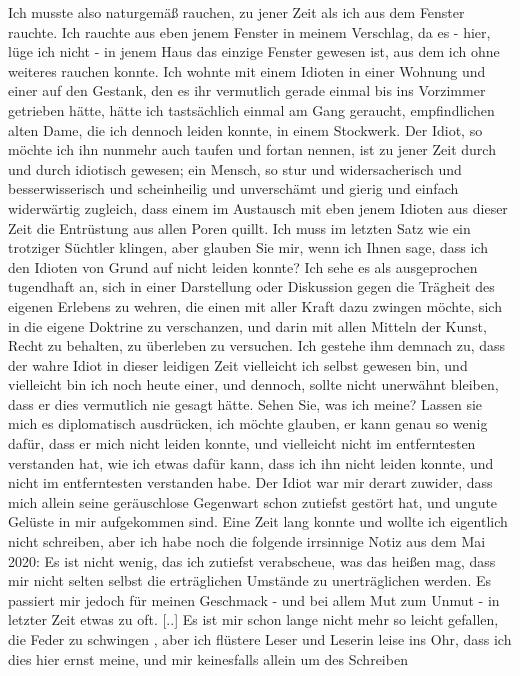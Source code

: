 \documentclass{scrbook}
\begin{document}
Ich musste also naturgemäß rauchen, zu jener Zeit als ich aus dem Fenster
rauchte. Ich rauchte aus eben jenem Fenster in meinem Verschlag, da es -
hier, lüge ich nicht - in jenem Haus das einzige Fenster gewesen ist, aus dem
ich ohne weiteres rauchen konnte. Ich wohnte mit einem Idioten in einer
Wohnung und einer auf den Gestank, den es ihr vermutlich gerade einmal bis
ins Vorzimmer getrieben hätte, hätte ich tastsächlich einmal am Gang
geraucht, empfindlichen alten Dame, die ich dennoch leiden konnte, in einem
Stockwerk. Der Idiot, so möchte ich ihn nunmehr auch taufen und fortan
nennen, ist zu jener Zeit durch und durch idiotisch gewesen; ein Mensch, so
stur und widersacherisch und besserwisserisch und scheinheilig und
unverschämt und gierig und einfach widerwärtig zugleich, dass einem im
Austausch mit eben jenem Idioten aus dieser Zeit die Entrüstung aus allen
Poren quillt. Ich muss im letzten Satz wie ein trotziger Süchtler klingen,
aber glauben Sie mir, wenn ich Ihnen sage, dass ich den Idioten von Grund auf
nicht leiden konnte? Ich sehe es als ausgeprochen tugendhaft an, sich in
einer Darstellung oder Diskussion gegen die Trägheit des eigenen Erlebens zu
wehren, die einen mit aller Kraft dazu zwingen möchte, sich in die eigene
Doktrine zu verschanzen, und darin mit allen Mitteln der Kunst, Recht zu
behalten, zu überleben zu versuchen. Ich gestehe ihm demnach zu, dass der
wahre Idiot in dieser leidigen Zeit vielleicht ich selbst gewesen bin, und
vielleicht bin ich noch heute einer, und dennoch, sollte nicht unerwähnt
bleiben, dass er dies vermutlich nie gesagt hätte. Sehen Sie, was ich meine?
Lassen sie mich es diplomatisch ausdrücken, ich möchte glauben, er kann genau
so wenig dafür, dass er mich nicht leiden konnte, und vielleicht nicht im
entferntesten verstanden hat, wie ich etwas dafür kann, dass ich ihn nicht
leiden konnte, und nicht im entferntesten verstanden habe. Der Idiot war mir
derart zuwider, dass mich allein seine geräuschlose Gegenwart schon zutiefst
gestört hat, und ungute Gelüste in mir aufgekommen sind. Eine Zeit lang
konnte und wollte ich eigentlich nicht schreiben, aber ich habe noch die
folgende irrsinnige Notiz aus dem Mai 2020: Es ist nicht wenig, das ich
zutiefst verabscheue, was das heißen mag, dass mir nicht selten selbst die
erträglichen Umstände zu unerträglichen werden. Es passiert mir jedoch für
meinen Geschmack - und bei allem Mut zum Unmut - in letzter Zeit etwas zu
oft. [..] Es ist mir schon lange nicht mehr so leicht gefallen, \glqq die
Feder zu schwingen \grqq, aber ich flüstere Leser und Leserin leise ins Ohr,
dass ich dies hier ernst meine, und mir keinesfalls allein um des Schreiben
\end{document}
